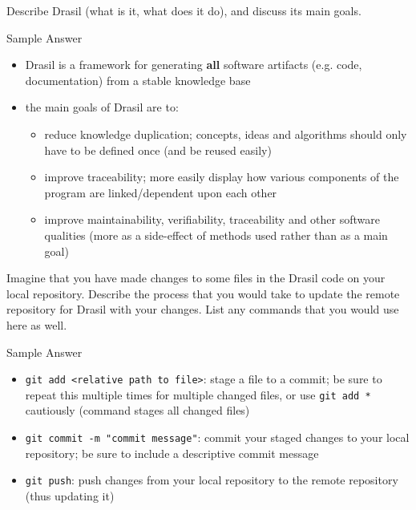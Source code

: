 \documentclass[12pt,fleqn]{examtst}
\begin{document}

\newpage
\noindent
\begin{minipage}{\textwidth}

Describe Drasil (what is it, what does it do), and discuss its main goals.


Sample Answer
\begin{itemize}
    \item Drasil is a framework for generating \textbf{all} software artifacts (e.g. code, documentation) from a stable knowledge base
    \item the main goals of Drasil are to:
    \begin{itemize}
        \item reduce knowledge duplication; concepts, ideas and algorithms should only have to be defined once (and be reused easily)
        \item improve traceability; more easily display how various components of the program are linked/dependent upon each other
        \item improve maintainability, verifiability, traceability and other software qualities (more as a side-effect of methods used rather than as a main goal)
    \end{itemize}
\end{itemize}

\rule{0cm}{1cm}

Imagine that you have made changes to some files in the Drasil code on your local repository. Describe the process that you would take to update the remote repository for Drasil with your changes. List any commands that you would use here as well.


Sample Answer
\begin{itemize}
    \item \lstinline{git add <relative path to file>}: stage a file to a commit; be sure to repeat this multiple times for multiple changed files, or use \lstinline{git add *} cautiously (command stages all changed files)
    \item \lstinline{git commit -m "commit message"}: commit your staged changes to your local repository; be sure to include a descriptive commit message
    \item \lstinline{git push}: push changes from your local repository to the remote repository (thus updating it)
\end{itemize}

\end{minipage}
\end{document}
